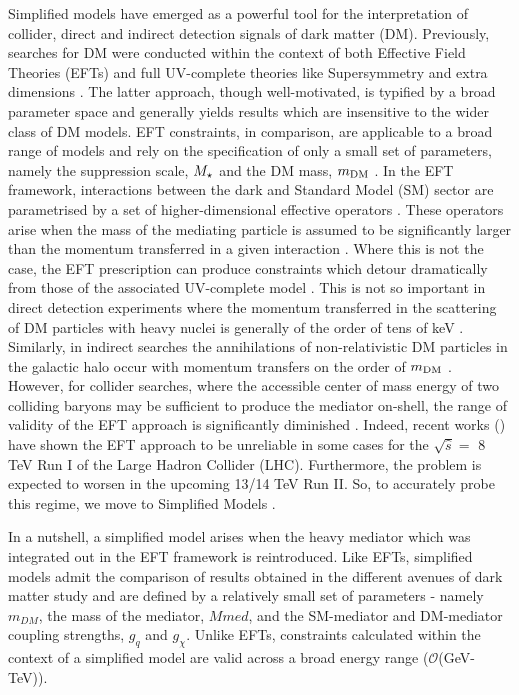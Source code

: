 Simplified models have emerged as a powerful tool for the interpretation of collider, direct and indirect detection signals of dark matter (DM). Previously,  searches for DM were conducted within the context of both Effective Field Theories (EFTs) \cite{Aad:1363019, ATLAS-CONF-2012-147, CMS-PAS-EXO-12-048, Buckley:2013jwa, Abdallah:1472683, MonoZ, MonoX} and full UV-complete theories like Supersymmetry \cite{ComppMSSM, Aad:2012ms, Aad:2012fqa, Aad:2014wea, SUSY_official_paper} and extra dimensions \cite{}. The latter approach, though well-motivated, is typified by a broad parameter space and generally yields results which are insensitive to the wider class of DM models. EFT constraints, in comparison, are applicable to a broad range of models and rely on the specification of only a small set of parameters, namely the suppression scale, $M_{\star}$ and the DM mass, $m_{\mathrm{DM}}$ \cite{}. 
In the EFT framework, interactions between the dark and Standard Model (SM) sector are parametrised by a set of higher-dimensional effective operators \cite{}. These operators arise when the mass of the mediating particle is assumed to be significantly larger than the momentum transferred in a given interaction \cite{}. Where this is not the case, the EFT prescription can produce constraints which detour dramatically from those of the associated UV-complete model \cite{Bai:2010hh, DMCons2, Fox:2011fx, Graesser:2011vj, An:2011ck}. This is not so important in direct detection experiments where the momentum transferred in the scattering of DM particles with heavy nuclei is generally of the order of tens of keV \cite{EFTDM, DMCons3}. Similarly, in indirect searches the annihilations of non-relativistic DM particles in the galactic halo occur with momentum transfers on the order of $m_{\mathrm{DM}}$ \cite{}. However, for collider searches, where the accessible center of mass energy of two colliding baryons may be sufficient to produce the mediator on-shell, the range of validity of the EFT approach is significantly diminished \cite{}. Indeed, recent works (\cite{}) have shown the EFT approach to be unreliable in some cases for the $\sqrt{\hat{s}} =$ 8 TeV Run I of the Large Hadron Collider (LHC). Furthermore, the problem is expected to worsen in the upcoming 13/14 TeV Run II. So, to accurately probe this regime, we move to Simplified Models \cite{Buchmueller:2014yoa}.

In a nutshell, a simplified model arises when the heavy mediator which was integrated out in the EFT framework is reintroduced. Like EFTs, simplified models admit the comparison of results obtained in the different avenues of dark matter study \cite{} and are defined by a relatively small set of parameters - namely $m_{DM}$, the mass of the mediator, $Mmed$, and the SM-mediator and DM-mediator coupling strengths, $g_{q}$ and $g_\chi$. Unlike EFTs, constraints calculated within the context of a simplified model are valid across a broad energy range ($\mathcal{O}$(GeV-TeV)).

